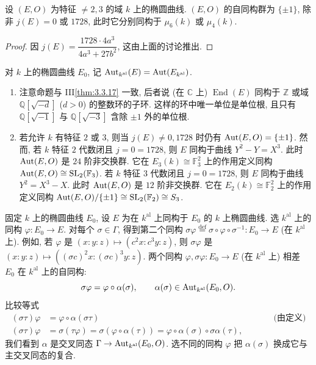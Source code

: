 \begin{proposition} \label{thm:4.7.13} 
设 $(E, O)$ 为特征 $\neq 2, 3$ 的域 $k$ 上的椭圆曲线. $(E, O)$ 的自同构群为 $\{\pm 1\}$, 除非 $j(E) = 0$ 或 $1728$, 此时它分别同构于 $\mu_6(k)$ 或 $\mu_4(k)$.
\end{proposition}

\begin{proof}
因 $j(E) = \dfrac{1728\cdot 4a^3}{4a^3 + 27b^2}$, 这由上面的讨论推出.
\end{proof}

对 $k$ 上的椭圆曲线 $E_0$, 记 $\operatorname{Aut}_{k^{\mathrm{al}}}(E) = \operatorname{Aut}(E_{k^{\mathrm{al}}})$.

\begin{remark} \label{thm:4.7.14} 
\begin{enumerate}[label=\textup{(\alph*)}]
\item 注意命题与 III\ref{thm:3.3.17} 一致, 后者说 (在 $\mathbb{C}$ 上) $\operatorname{End}(E)$ 同构于 $\mathbb{Z}$ 或域 $\mathbb{Q}[\sqrt{-d}]$ ($d > 0$) 的整数环的子环. 这样的环中唯一单位是单位根, 且只有 $\mathbb{Q}[\sqrt{-1}]$ 与 $\mathbb{Q}[\sqrt{-3}]$ 含除 $\pm 1$ 外的单位根.
\item 若允许 $k$ 有特征 $2$ 或 $3$, 则当 $j(E)\neq 0, 1728$ 时仍有 $\operatorname{Aut}(E, O) = \{\pm 1\}$.
然而, 若 $k$ 特征 $2$ 代数闭且 $j = 0 = 1728$, 则 $E$ 同构于曲线 $Y^2 - Y = X^3$. 此时 $\operatorname{Aut}(E, O)$ 是 $24$ 阶非交换群. 它在 $E_3(k)\cong\mathbb{F}_3^2$ 上的作用定义同构 $\operatorname{Aut}(E, O)\cong\operatorname{SL}_2(\mathbb{F}_3)$.
若 $k$ 特征 $3$ 代数闭且 $j = 0 = 1728$, 则 $E$ 同构于曲线 $Y^2 = X^3 - X$. 此时 $\operatorname{Aut}(E, O)$ 是 $12$ 阶非交换群. 它在 $E_2(k)\cong\mathbb{F}_2^2$ 上的作用定义同构 $\operatorname{Aut}(E, O)/\{\pm 1\}\cong\operatorname{SL}_2(\mathbb{F}_2)\cong S_3$.
\end{enumerate}
\end{remark}

固定 $k$ 上的椭圆曲线 $E_0$, 设 $E$ 为在 $k^{\mathrm{al}}$ 上同构于 $E_0$ 的 $k$ 上椭圆曲线. 选 $k^{\mathrm{al}}$ 上的同构 $\varphi\colon E_0\to E$. 对每个 $\sigma\in\Gamma$, 得到第二个同构 $\sigma\varphi \overset{\text{def}}{=} \sigma\circ\varphi\circ\sigma^{-1}\colon E_0\to E$ (在 $k^{\mathrm{al}}$ 上). 例如, 若 $\varphi$ 是 $(x:y:z)\mapsto(c^2x:c^3y:z)$, 则 $\sigma\varphi$ 是 $(x:y:z)\mapsto((\sigma c)^2x:(\sigma c)^3y:z)$. 两个同构 $\varphi, \sigma\varphi\colon E_0\to E$ (在 $k^{\mathrm{al}}$ 上) 相差 $E_0$ 在 $k^{\mathrm{al}}$ 上的自同构:
\[
\sigma\varphi = \varphi\circ\alpha(\sigma), \qquad \alpha(\sigma)\in\operatorname{Aut}_{k^{\mathrm{al}}}(E_0, O).
\]
比较等式
\begin{align*}
(\sigma\tau)\varphi &= \varphi\circ\alpha(\sigma\tau) && \qquad \text{(由定义)}\\
(\sigma\tau)\varphi &= \sigma(\tau\varphi) = \sigma(\varphi\circ\alpha(\tau)) = \varphi\circ\alpha(\sigma)\circ\sigma\alpha(\tau),
\end{align*}
我们看到 $\alpha$ 是交叉同态 $\Gamma\to\operatorname{Aut}_{k^{\mathrm{al}}}(E_0, O)$. 选不同的同构 $\varphi$ 把 $\alpha(\sigma)$ 换成它与主交叉同态的复合.

